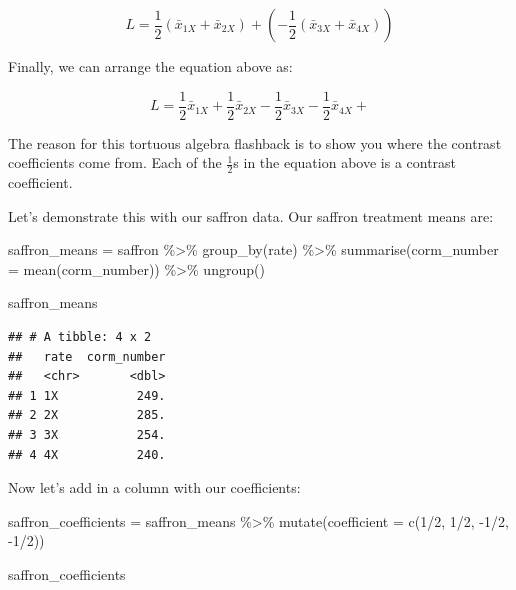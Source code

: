 \documentclass[
]{book}
\newenvironment{Shaded}{\begin{snugshade}}{\end{snugshade}}
\newcommand{\AttributeTok}[1]{\textcolor[rgb]{0.77,0.63,0.00}{#1}}
\newcommand{\DecValTok}[1]{\textcolor[rgb]{0.00,0.00,0.81}{#1}}
\newcommand{\FunctionTok}[1]{\textcolor[rgb]{0.00,0.00,0.00}{#1}}
\newcommand{\NormalTok}[1]{#1}
\newcommand{\OtherTok}[1]{\textcolor[rgb]{0.56,0.35,0.01}{#1}}
\newcommand{\SpecialCharTok}[1]{\textcolor[rgb]{0.00,0.00,0.00}{#1}}
\begin{document}
\[ L = \frac{1}{2}(\bar{x}_{1X} + \bar{x}_{2X}) + (- \frac{1}{2}(\bar{x}_{3X} + \bar{x}_{4X}))\]

Finally, we can arrange the equation above as:

\[ L = \frac{1}{2}\bar{x}_{1X} + \frac{1}{2}\bar{x}_{2X} - \frac{1}{2}\bar{x}_{3X} - \frac{1}{2}\bar{x}_{4X} + \]

The reason for this tortuous algebra flashback is to show you where the contrast coefficients come from. Each of the \(\frac{1}{2}\)s in the equation above is a contrast coefficient.

Let's demonstrate this with our saffron data. Our saffron treatment means are:

\begin{Shaded}
\begin{Highlighting}[]
\NormalTok{saffron\_means }\OtherTok{=}\NormalTok{ saffron }\SpecialCharTok{\%\textgreater{}\%}
  \FunctionTok{group\_by}\NormalTok{(rate) }\SpecialCharTok{\%\textgreater{}\%}
  \FunctionTok{summarise}\NormalTok{(}\AttributeTok{corm\_number =} \FunctionTok{mean}\NormalTok{(corm\_number)) }\SpecialCharTok{\%\textgreater{}\%}
  \FunctionTok{ungroup}\NormalTok{()}

\NormalTok{saffron\_means}
\end{Highlighting}
\end{Shaded}

\begin{verbatim}
## # A tibble: 4 x 2
##   rate  corm_number
##   <chr>       <dbl>
## 1 1X           249.
## 2 2X           285.
## 3 3X           254.
## 4 4X           240.
\end{verbatim}

Now let's add in a column with our coefficients:

\begin{Shaded}
\begin{Highlighting}[]
\NormalTok{saffron\_coefficients }\OtherTok{=}\NormalTok{ saffron\_means }\SpecialCharTok{\%\textgreater{}\%}
  \FunctionTok{mutate}\NormalTok{(}\AttributeTok{coefficient =} \FunctionTok{c}\NormalTok{(}\DecValTok{1}\SpecialCharTok{/}\DecValTok{2}\NormalTok{, }\DecValTok{1}\SpecialCharTok{/}\DecValTok{2}\NormalTok{, }\SpecialCharTok{{-}}\DecValTok{1}\SpecialCharTok{/}\DecValTok{2}\NormalTok{, }\SpecialCharTok{{-}}\DecValTok{1}\SpecialCharTok{/}\DecValTok{2}\NormalTok{))}

\NormalTok{saffron\_coefficients}
\end{Highlighting}
\end{Shaded}
\end{document}
